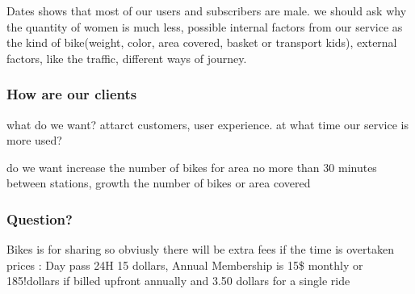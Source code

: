 \documentclass[
]{article}
\begin{document}
Dates shows that most of our users and subscribers are male. we should
ask why the quantity of women is much less, possible internal factors
from our service as the kind of bike(weight, color, area covered, basket
or transport kids), external factors, like the traffic, different ways
of journey.

\hypertarget{how-are-our-clients}{%
\subsubsection{How are our clients}\label{how-are-our-clients}}

what do we want? attarct customers, user experience. at what time our
service is more used?

do we want increase the number of bikes for area no more than 30 minutes
between stations, growth the number of bikes or area covered

\hypertarget{question}{%
\subsubsection{Question?}\label{question}}

Bikes is for sharing so obviusly there will be extra fees if the time is
overtaken prices : Day pass 24H 15 dollars, Annual Membership is 15\$
monthly or 185!dollars if billed upfront annually and 3.50 dollars for a
single ride
\end{document}
